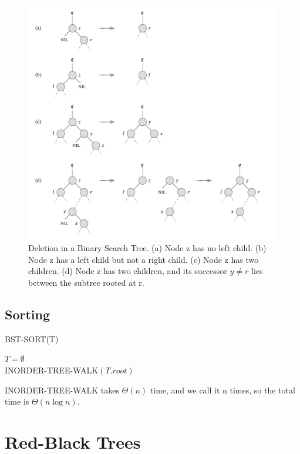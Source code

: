 \begin{figure}[H]
    \centering
    \includegraphics[width=\textwidth]{assets/deletion_bt.png}
    \caption{Deletion in a Binary Search Tree. (a) Node z has no left child. (b) Node z has a left child but not a right child. (c) Node z has two children. (d) Node z has two children, and its successor $y \neq r$ lies between the subtree rooted at r.}
\end{figure}

\subsection*{Sorting}

\begin{algorithm}
    \caption{BST-SORT(T)}
    $T = \emptyset$ \\
    INORDER-TREE-WALK$(T.root)$\\
\end{algorithm}

INORDER-TREE-WALK takes $\Theta(n)$ time, and we call it n times, so the total time is $\Theta(n \log n)$.

\section{Red-Black Trees}

